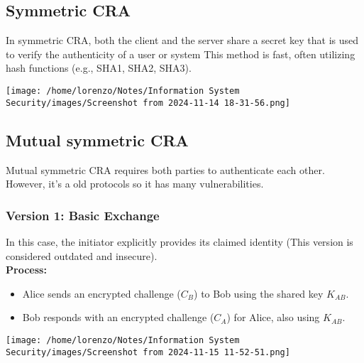 \subsection{Symmetric CRA}
\begin{minipage}{0.3\textwidth}
    \vspace{-0.9cm}
    In symmetric CRA, both the client and the server share a secret key that is used to verify the authenticity of a user or system This method is fast, often utilizing hash 
    functions (e.g., SHA1, SHA2, SHA3).
\end{minipage} 
\hspace{0.001cm}
\begin{minipage}{0.7\textwidth}
    \centering
    \texttt{[image: /home/lorenzo/Notes/Information System Security/images/Screenshot from 2024-11-14 18-31-56.png]}
\end{minipage}

\subsection{Mutual symmetric CRA}
Mutual symmetric CRA requires both parties to authenticate each other.
However, it's a old protocols so it has many vulnerabilities.

\subsubsection{Version 1: Basic Exchange}
\begin{minipage}{0.5\textwidth}
In this case, the initiator explicitly provides its claimed identity (This version is considered outdated and insecure).
\\\textbf{Process:} 
\begin{itemize}
    \item Alice sends an encrypted challenge (\(C_B\)) to Bob using the shared key \(K_{AB}\).
    \item Bob responds with an encrypted challenge (\(C_A\)) for Alice, also using \(K_{AB}\).
\end{itemize}
\end{minipage} 
\hspace{0cm}
\begin{minipage}{0.5\textwidth}
    \centering
    \texttt{[image: /home/lorenzo/Notes/Information System Security/images/Screenshot from 2024-11-15 11-52-51.png]}
\end{minipage}

